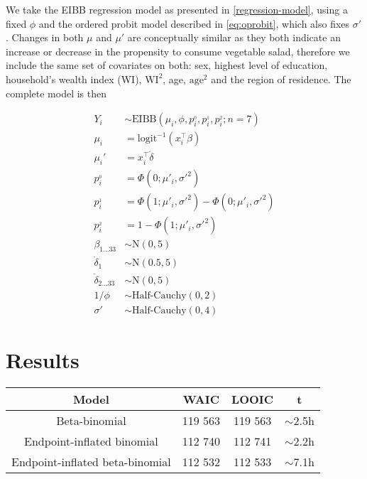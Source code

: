 We take the EIBB regression model as presented in \ref{regression-model}, using a fixed $\phi$ and the ordered probit model described in \ref{eq:oprobit}, which also fixes $\sigma'$. Changes in both $\mu$ and $\mu'$ are conceptually similar as they both indicate an increase or decrease in the propensity to consume vegetable salad, therefore we include the same set of covariates on both: sex, highest level of education, household's wealth index (WI), $\text{WI}^2$, age, $\text{age}^2$ and the region of residence. The complete model is then

\begin{equation}
\begin{split}
Y_{i} &\sim \mathrm{EIBB}(\mu_i, \phi, p^{_0}_{i}, p^{_1}_{i}, p^{_2}_{i}; n = 7) \\
\mu_{i} &= \text{logit}^{-1}\left( x_{i}^\top \beta \right) \\
\mu_{i}' &= x_{i}^{\top} \dot{\delta} \\
p^{_0}_i &= \Phi(0;\mu'_{i},\sigma'^{2}) \\
p^{_1}_i &= \Phi(1;\mu'_{i},\sigma'^{2}) - \Phi(0;\mu'_{i},\sigma'^{2})\\
p^{_2}_i &= 1 - \Phi(1;\mu'_{i},\sigma'^{2})\\
\beta_{1 ... 33} &\sim \text{N}(0, 5)\\
\dot{\delta}_1 &\sim \text{N}(0.5, 5)\\
\dot{\delta}_{2 ... 33} &\sim \text{N}(0, 5)\\
1/\phi &\sim \text{Half-Cauchy}(0, 2)\\
\sigma' &\sim \text{Half-Cauchy}(0, 4)
\end{split}
\end{equation}

\section{Results}
\label{sec:applications-results}

\begin{table}[h!]
\centering
\begin{tabular}{||c c c c||} 
\hline
Model                                          & WAIC      & LOOIC    & t\\ [0.5ex] 
 \hline\hline
Beta-binomial                              & 119 563  &  119 563 & $\sim$2.5h\\
Endpoint-inflated binomial          & 112 740  &  112 741 & $\sim$2.2h\\
Endpoint-inflated beta-binomial  & 112 532  &  112 533 & $\sim$7.1h\\  [1ex] 
 \hline
 \end{tabular}
\end{table}

